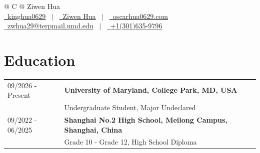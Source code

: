 \documentclass[a4paper,12pt]{article}
\begin{document}
\pagestyle{empty}



\begin{tabularx}{\linewidth}{@{} C @{}}
    \Huge{Ziwen Hua}                                                                    \\[7.5pt]
    \href{https://github.com/kinghua0629}{\raisebox{-0.05\height}\faGithub\ kinghua0629} \ $|$ \
    \href{https://linkedin.com/in/ziwen-hua-625a6a3b4}{\raisebox{-0.05\height}\faLinkedin\ Ziwen Hua} \ $|$ \
    \href{https://oscarhua0629.com}{\raisebox{-0.05\height}\faGlobe \ oscarhua0629.com} \\
    \href{mailto:zwhua29@terpmail.umd.edu}{\raisebox{-0.05\height}\faEnvelope \ zwhua29@terpmail.umd.edu} \ $|$ \
    \href{tel:+1(301)635-9796}{\raisebox{-0.05\height}\faMobile \ +1(301)635-9796}      \\
\end{tabularx}

\section{Education}
\begin{tabularx}{\linewidth}{@{}l X@{}}
    09/2026 - Present & \textbf{University of Maryland, College Park, MD, USA}              \\ & Undergraduate Student, Major Undeclared \\
    09/2022 - 06/2025 & \textbf{Shanghai No.2 High School, Meilong Campus, Shanghai, China} \\ & Grade 10 - Grade 12, High School Diploma \\
\end{tabularx}
\end{document}

